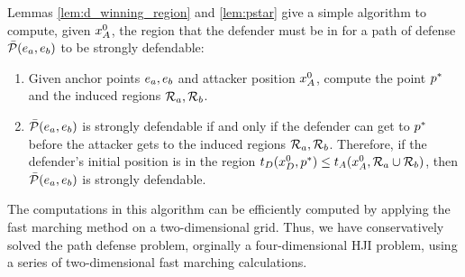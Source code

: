 Lemmas \ref{lem:d_winning_region} and \ref{lem:pstar} give a simple algorithm to compute, given $x_A^0$, the region that the defender must be in for a path of defense $\bar{\mathcal{P}}(e_a,e_b)$ to be strongly defendable:
\begin{enumerate}
\item Given anchor points $e_a, e_b$ and attacker position $x_A^0$, compute the point $p^*$ and the induced regions $\mathcal{R}_a,\mathcal{R}_b$.
\item $\bar{\mathcal{P}}(e_a,e_b)$ is strongly defendable if and only if the defender can get to $p^*$ before the attacker gets to the induced regions $\mathcal{R}_a,\mathcal{R}_b$. Therefore, if the defender's initial position is in the region $t_D(x_D^0,p^*) \le t_A(x_A^0,\mathcal{R}_a \cup \mathcal{R}_b)$, then $\bar{\mathcal{P}}(e_a,e_b)$ is strongly defendable.
\end{enumerate}

The computations in this algorithm can be efficiently computed by applying the fast marching method \cite{} on a two-dimensional grid. Thus, we have conservatively solved the path defense problem, orginally a four-dimensional HJI problem, using a series of two-dimensional fast marching calculations. 

